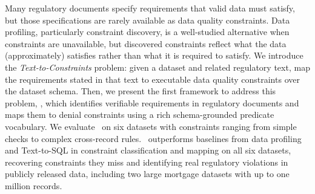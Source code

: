 Many regulatory documents specify requirements that valid data must satisfy, but those specifications are rarely available as data quality constraints. 
Data profiling, particularly constraint discovery, is a well-studied alternative when constraints are unavailable, but discovered constraints reflect what the data (approximately) satisfies rather than what it is required to satisfy.
We introduce the \emph{Text-to-Constraints} problem: given a dataset and related regulatory text, map the requirements stated in that text to executable data quality constraints over the dataset schema. 
Then, we present the first framework to address this problem, \system, which identifies verifiable requirements in regulatory documents and maps them to denial constraints using a rich schema-grounded predicate vocabulary. 
We evaluate \system\ on six datasets with constraints ranging from simple checks to complex cross-record rules. \system\ outperforms baselines from data profiling and Text-to-SQL in constraint classification and mapping on all six datasets, recovering constraints they miss and identifying real regulatory violations in publicly released data, including two large mortgage datasets with up to one million records.







